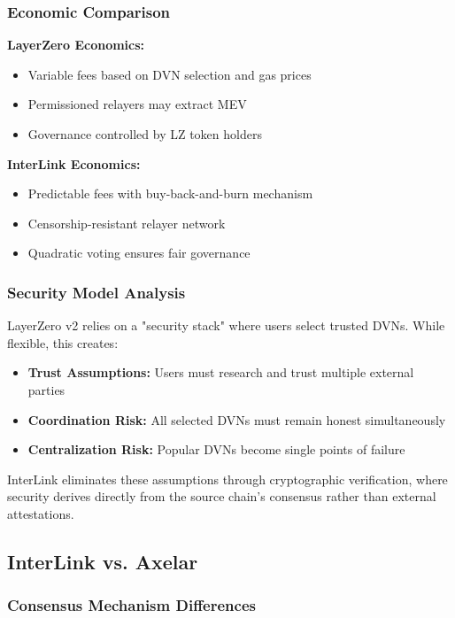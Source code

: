 \documentclass[11pt,a4paper]{article}
\begin{document}
\subsubsection{Economic Comparison}

\textbf{LayerZero Economics:}
\begin{itemize}
    \item Variable fees based on DVN selection and gas prices
    \item Permissioned relayers may extract MEV
    \item Governance controlled by LZ token holders
\end{itemize}

\textbf{InterLink Economics:}
\begin{itemize}
    \item Predictable fees with buy-back-and-burn mechanism
    \item Censorship-resistant relayer network
    \item Quadratic voting ensures fair governance
\end{itemize}

\subsubsection{Security Model Analysis}

LayerZero v2 relies on a "security stack" where users select trusted DVNs. While flexible, this creates:
\begin{itemize}
    \item \textbf{Trust Assumptions:} Users must research and trust multiple external parties
    \item \textbf{Coordination Risk:} All selected DVNs must remain honest simultaneously
    \item \textbf{Centralization Risk:} Popular DVNs become single points of failure
\end{itemize}

InterLink eliminates these assumptions through cryptographic verification, where security derives directly from the source chain's consensus rather than external attestations.

\subsection{InterLink vs. Axelar}

\subsubsection{Consensus Mechanism Differences}
\end{document}

